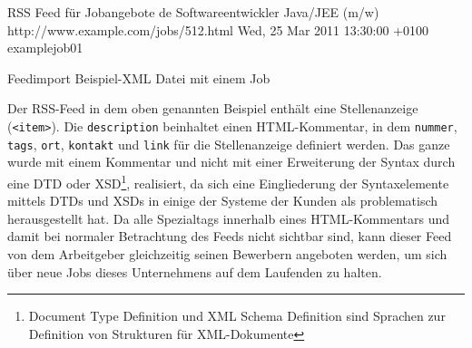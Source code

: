 \begin{ruby}[label=beispiel\_job.xml, fontsize=\relsize{-2}]
 
    RSS Feed für Jobangebote 
    de
      Softwareentwickler Java/JEE (m/w)
        \PY{c+cp}{<![CDATA[}
\PY{c+cp}{        ]]>}
      http://www.example.com/jobs/512.html
      Wed, 25 Mar 2011 13:30:00 +0100
      example\PYZus{}job\PYZus{}01
\end{ruby}
\captionsetup{type=lstlisting}
\caption{Feedimport Beispiel-XML Datei mit einem Job}
Der RSS-Feed in dem oben genannten Beispiel enthält eine Stellenanzeige (\verb|<item>|). Die \verb|description| beinhaltet einen HTML-Kommentar, in dem \verb|nummer|, \verb|tags|, \verb|ort|, \verb|kontakt| und \verb|link| für die Stellenanzeige definiert werden. Das ganze wurde mit einem Kommentar und nicht mit einer Erweiterung der Syntax durch eine DTD oder XSD\footnote{Document Type Definition und XML Schema Definition sind Sprachen zur Definition von Strukturen für XML-Dokumente}, realisiert, da sich eine Eingliederung der Syntaxelemente mittels DTDs und XSDs in einige der Systeme der Kunden als problematisch herausgestellt hat. Da alle Spezialtags innerhalb eines HTML-Kommentars und damit bei normaler Betrachtung des Feeds nicht sichtbar sind, kann dieser Feed von dem Arbeitgeber gleichzeitig seinen Bewerbern angeboten werden, um sich über neue Jobs dieses Unternehmens auf dem Laufenden zu halten.

